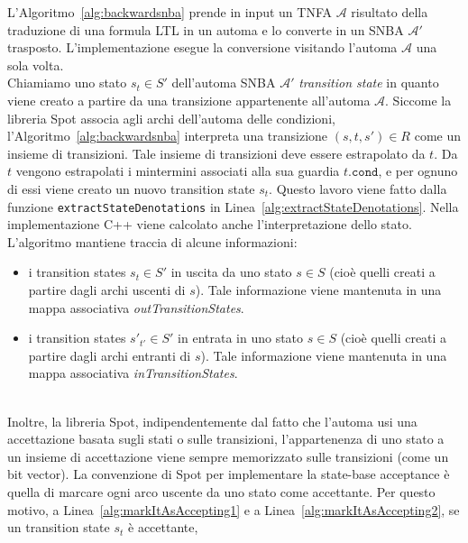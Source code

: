 \documentclass{article}
\begin{document}
    \newpage

    L'Algoritmo~\ref{alg:backwardsnba} prende in input un TNFA $\mathcal{A}$ risultato della traduzione di una formula
    LTL in un automa e lo converte in un SNBA $\mathcal{A'}$ trasposto.
    L'implementazione esegue la conversione visitando l'automa $\mathcal{A}$ una sola volta.
    \vspace{0.15cm}\\
    Chiamiamo uno stato $s_t \in S'$ dell'automa SNBA $\mathcal{A'}$ \textit{transition state} in quanto viene creato a partire da una
    transizione appartenente all'automa $\mathcal{A}$.
    Siccome la libreria Spot associa agli archi dell'automa delle condizioni, l'Algoritmo~\ref{alg:backwardsnba} interpreta una transizione $(s, t, s') \in R$
    come un insieme di transizioni.
    Tale insieme di transizioni deve essere estrapolato da $t$. Da $t$ vengono estrapolati i mintermini associati alla sua
    guardia $t.\texttt{cond}$, e per ognuno di essi viene creato un nuovo transition state $s_t$.
    Questo lavoro viene fatto dalla funzione \texttt{extractStateDenotations} in Linea~\ref{alg:extractStateDenotations}.
    Nella implementazione C++ viene calcolato anche l'interpretazione dello stato.
    \vspace{0.15cm}\\
    L'algoritmo mantiene traccia di alcune informazioni:
    \begin{itemize}
        \item i transition states $s_t \in S'$ in uscita da uno stato $s\in S$ (cioè quelli creati a partire dagli archi uscenti di $s$). Tale informazione viene mantenuta in una mappa associativa \textit{outTransitionStates}.
        \item i transition states $s'_{t'} \in S'$ in entrata in uno stato $s\in S$ (cioè quelli creati a partire dagli archi entranti di $s$). Tale informazione viene mantenuta in una mappa associativa \textit{inTransitionStates}.
    \end{itemize}
    \vspace{0.15cm}\\
    Inoltre, la libreria Spot, indipendentemente dal fatto che l'automa usi una accettazione basata sugli stati o sulle transizioni, l'appartenenza
    di uno stato a un insieme di accettazione viene sempre memorizzato sulle transizioni (come un bit vector).
    La convenzione di Spot per implementare la state-base acceptance è quella di marcare ogni arco uscente da uno stato come accettante.
    Per questo motivo, a Linea~\ref{alg:markItAsAccepting1} e a Linea~\ref{alg:markItAsAccepting2}, se un transition state $s_t$ è accettante,
\end{document}
